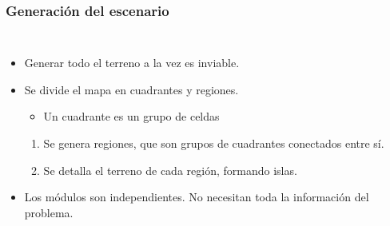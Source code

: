 \begin{frame}
\frametitle{Generación del escenario}

\begin{columns}
	\begin{itemize}
		\item<1-> Generar todo el terreno a la vez es \textcolor{UDCpink}{inviable}.
		
		\vspace{0.5em}
		
		\item<2-> Se divide el mapa en \textcolor{UDCpink}{cuadrantes} y \textcolor{UDCpink}{regiones}.
		
		\vspace{0.5em}
		
		\begin{itemize}
			\item<2-> Un cuadrante es un grupo de celdas
		\end{itemize}
		
		\begin{enumerate}
			\item<3-> Se genera regiones, que son grupos de cuadrantes conectados entre sí.
			
			\vspace{0.5em}
			
			\item<4-> Se detalla el terreno de cada región, formando islas.
		\end{enumerate}
		
		\vspace{0.5em}
		\item<5-> Los módulos son \textcolor{UDCpink}{independientes}. No necesitan toda la información del problema.
	\end{itemize}
	

\end{columns}
\end{frame}
